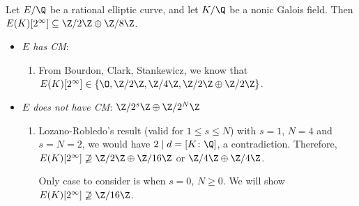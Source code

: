 \begin{frame}[plain,t] 
\begin{lem}
Let $E/\Q$ be a rational elliptic curve, and let $K/\Q$ be a nonic Galois field. Then $E(K)[2^\infty] \subseteq \Z/2\Z \oplus \Z/8\Z$.
\end{lem}

\pf 
\begin{itemize}
\item {\itshape $E$ has CM}: 
	\begin{enumerate}[--]
	\item From Bourdon, Clark, Stankewicz, we know that $E(K)[2^\infty] \in \{ \O, \Z/2\Z, \Z/4\Z, \Z/2\Z \oplus \Z/2\Z \}$. 
	\end{enumerate} \pspace

\item {\itshape $E$ does not have CM}: $\Z/2^s\Z \oplus \Z/2^N\Z$
	\begin{enumerate}[--]
	\item Lozano-Robledo's result (valid for $1 \leq s \leq N$) with $s= 1$, $N= 4$ and $s= N= 2$, we would have $2 \mid d= [K \colon \Q]$, a contradiction. Therefore, $E(K)[2^\infty] \not\supseteq \Z/2\Z \oplus \Z/16\Z$ or $\Z/4\Z \oplus \Z/4\Z$. \pspace
	
	Only case to consider is when $s= 0$, $N \geq 0$. We will show $E(K)[2^\infty] \not\supseteq \Z/16\Z$. 
	\end{enumerate}
\end{itemize}
\end{frame}






